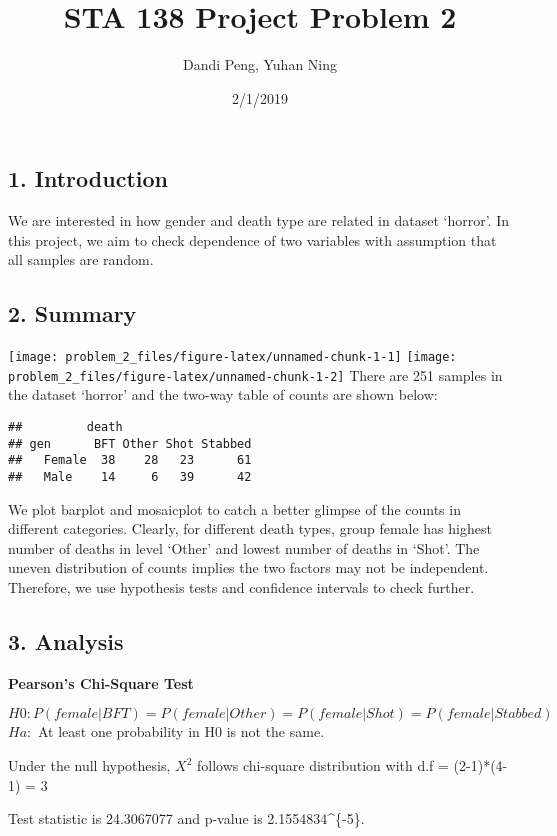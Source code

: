 \documentclass[]{article}
\title{STA 138 Project Problem 2}
\author{Dandi Peng, Yuhan Ning}
\date{2/1/2019}
\begin{document}
\maketitle

\subsection{1. Introduction}\label{introduction}

 We are interested in how gender and death type are related in dataset
`horror'. In this project, we aim to check dependence of two variables
with assumption that all samples are random.

\subsection{2. Summary}\label{summary}

\texttt{[image: problem\_2\_files/figure-latex/unnamed-chunk-1-1]}
\texttt{[image: problem\_2\_files/figure-latex/unnamed-chunk-1-2]}
There are 251 samples in the dataset `horror' and the two-way table of
counts are shown below:

\begin{verbatim}
##         death
## gen      BFT Other Shot Stabbed
##   Female  38    28   23      61
##   Male    14     6   39      42
\end{verbatim}

 We plot barplot and mosaicplot to catch a better glimpse of the counts
in different categories. Clearly, for different death types, group
female has highest number of deaths in level `Other' and lowest number
of deaths in `Shot'. The uneven distribution of counts implies the two
factors may not be independent. Therefore, we use hypothesis tests and
confidence intervals to check further.

\subsection{3. Analysis}\label{analysis}

\textbf{Pearson's Chi-Square Test}

\(H0: P(female|BFT) = P(female|Other) = P(female|Shot) = P(female|Stabbed)\)
\(Ha:\) At least one probability in H0 is not the same.

Under the null hypothesis, \(X^2\) follows chi-square distribution with
d.f = (2-1)*(4-1) = 3

 Test statistic is 24.3067077 and p-value is
2.1554834\^{}\{-5\}.
\end{document}
